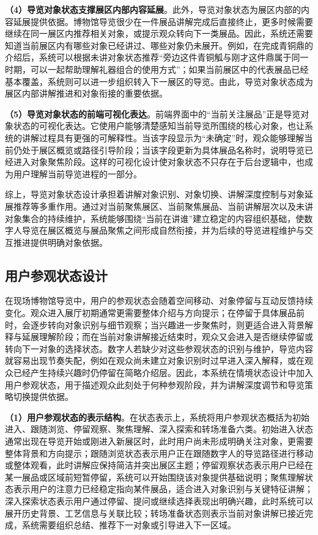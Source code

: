 \textbf{（4）导览对象状态支撑展区内部内容延展}。此外，导览对象状态为展区内部的内容延展提供依据。博物馆导览很少在一件展品讲解完成后直接终止，更多时候需要继续在同一展区内推荐相关对象，或提示观众转向下一类展品。因此，系统还需要知道当前展区内有哪些对象已经讲过、哪些对象仍未展开。例如，在完成青铜鼎的介绍后，系统可以根据未讲对象状态推荐“旁边这件青铜觚与刚才这件鼎属于同一时期，可以一起帮助理解礼器组合的使用方式”；如果当前展区中的代表展品已经基本覆盖，系统则可以进一步组织转入下一展区的导览。由此，导览对象状态成为展区内部讲解推进和对象衔接的重要依据。

\textbf{（5）导览对象状态的前端可视化表达}。前端界面中的“当前关注展品”正是导览对象状态的可视化表达。它使用户能够清楚感知当前导览所围绕的核心对象，也让系统的讲解过程具有更强的可解释性。当该字段显示为“未确定”时，观众能够理解当前仍处于展区概览或路径引导阶段；当该字段更新为具体展品名称时，说明导览已经进入对象聚焦阶段。这样的可视化设计使对象状态不只存在于后台逻辑中，也成为用户理解当前导览进程的一部分。

综上，导览对象状态设计承担着讲解对象识别、对象切换、讲解深度控制与对象延展推荐等多重作用。通过对当前聚焦展区、当前聚焦展品、当前讲解层次以及未讲对象集合的持续维护，系统能够围绕“当前在讲谁”建立稳定的内容组织基础，使数字人导览在展区概览与展品聚焦之间形成自然衔接，并为后续的导览进程维护与交互推进提供明确对象依据。

\subsection{用户参观状态设计}
在现场博物馆导览中，用户的参观状态会随着空间移动、对象停留与互动反馈持续变化。观众进入展厅初期通常更需要整体介绍与方向提示；在停留于具体展品前时，会逐步转向对象识别与细节观察；当兴趣进一步聚焦时，则更适合进入背景解释与延展理解阶段；而在当前对象讲解接近结束时，观众又会进入是否继续停留或转向下一对象的选择状态。数字人若缺少对这些参观状态的识别与维护，导览内容就容易出现节奏失配，例如在观众尚未建立对象识别时过早进入深入解释，或在观众已经产生持续兴趣时仍停留在简略介绍层。因此，本系统在情境状态设计中加入用户参观状态，用于描述观众此刻处于何种参观阶段，并为讲解深度调节和导览策略切换提供依据。

\textbf{（1）用户参观状态的表示结构}。在状态表示上，系统将用户参观状态概括为初始进入、跟随浏览、停留观察、聚焦理解、深入探索和转场准备六类。初始进入状态通常出现在导览开始或刚进入新展区时，此时用户尚未形成明确关注对象，更需要整体背景和方向提示；跟随浏览状态表示用户正在跟随数字人的导览路径进行移动或整体观看，此时讲解应保持简洁并突出展区主题；停留观察状态表示用户已经在某一展品或区域前短暂停留，系统可以开始围绕该对象提供基础说明；聚焦理解状态表示用户的注意力已经稳定指向某件展品，适合进入对象识别与关键特征讲解；深入探索状态表示用户通过停留、提问或继续选择表现出明确兴趣，此时系统可以展开历史背景、工艺信息与关联比较；转场准备状态则表示当前对象讲解已接近完成，系统需要组织总结、推荐下一对象或引导进入下一区域。

